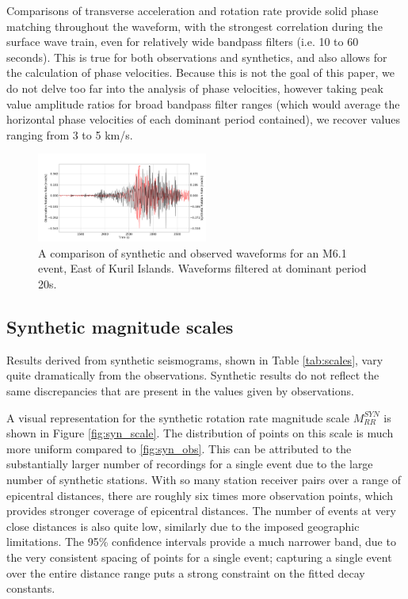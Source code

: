 \documentclass{gji}
\begin{document}

Comparisons of transverse acceleration and rotation rate provide solid phase matching throughout the waveform, with the strongest correlation during the surface wave train, even for relatively wide bandpass filters (i.e. 10 to 60 seconds). This is true for both observations and synthetics, and also allows for the calculation of phase velocities. Because this is not the goal of this paper, we do not delve too far into the analysis of phase velocities, however taking peak value amplitude ratios for broad bandpass filter ranges (which would average the horizontal phase velocities of each dominant period contained), we recover values ranging from 3 to 5 km/s. 

\begin{figure}
\centerline{\includegraphics[width=0.5\textwidth]{C201304191958A_10-60_rotationrate_compare}}
\caption{A comparison of synthetic and observed waveforms for an M6.1 event, East of Kuril Islands. Waveforms filtered at dominant period 20s.}
\label{fig:both}
\end{figure}

\subsection{Synthetic magnitude scales}
Results derived from synthetic seismograms, shown in Table \ref{tab:scales}, vary quite dramatically from the observations. Synthetic results do not reflect the same discrepancies that are present in the values given by observations.

A visual representation for the synthetic rotation rate magnitude scale $M_{RR}^{SYN}$ is shown in Figure \ref{fig:syn_scale}. The distribution of points on this scale is much more uniform compared to \ref{fig:syn_obs}. This can be attributed to the substantially larger number of recordings for a single event due to the large number of synthetic stations. With so many station receiver pairs over a range of epicentral distances, there are roughly six times more observation points, which provides stronger coverage of epicentral distances. The number of events at very close distances is also quite low, similarly due to the imposed geographic limitations. The 95\% confidence intervals provide a much narrower band, due to the very consistent spacing of points for a single event; capturing a single event over the entire distance range puts a strong constraint on the fitted decay constants.
\end{document}
